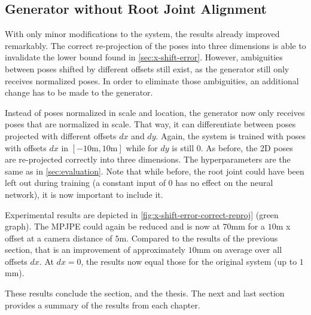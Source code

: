 

\subsection{Generator without Root Joint Alignment}

With only minor modifications to the system, the results already improved remarkably.
The correct re-projection of the poses into three dimensions is able to invalidate the lower bound found in \autoref{sec:x-shift-error}.
However, ambiguities between poses shifted by different offsets still exist, as the generator still only receives normalized poses.
In order to eliminate those ambiguities, an additional change has to be made to the generator.

Instead of poses normalized in scale and location, the generator now only receives poses that are normalized in scale.
That way, it can differentiate between poses projected with different offsets $dx$ and $dy$.
Again, the system is trained with poses with offsets $dx$ in $[-10\text{m}, 10\text{m}]$ while for $dy$ is still $0$.
As before, the 2D poses are re-projected correctly into three dimensions.
The hyperparameters are the same as in \autoref{sec:evaluation}.
Note that while before, the root joint could have been left out during training (a constant input of $0$ has no effect on the neural network), it is now important to include it.

Experimental results are depicted in \autoref{fig:x-shift-error-correct-reproj} (green graph).
The MPJPE could again be reduced and is now at $70$mm for a $10$m x offset at a camera distance of $5$m.
Compared to the results of the previous section, that is an improvement of approximately $10$mm on average over all offsets $dx$.
At $dx = 0$, the results now equal those for the original system (up to $1$mm).


These results conclude the section, and the thesis.
The next and last section provides a summary of the results from each chapter.
